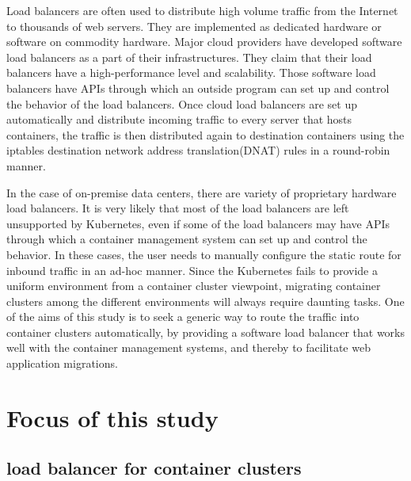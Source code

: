Load balancers are often used to distribute high volume traffic from the Internet to thousands of web servers.
They are implemented as dedicated hardware or software on commodity hardware.
Major cloud providers have developed software load balancers\cite{eisenbud2016maglev,patel2013ananta} as a part of their infrastructures.
They claim that their load balancers have a high-performance level and scalability.
Those software load balancers have APIs through which an outside program can set up and control the behavior of the load balancers.
Once cloud load balancers are set up automatically and distribute incoming traffic to every server that hosts containers,
the traffic is then distributed again to destination containers using the iptables destination network address translation(DNAT)\cite{MartinA.Brown2017,Marmol2015} rules in a round-robin manner.

In the case of on-premise data centers, there are variety of proprietary hardware load balancers.
It is very likely that most of the load balancers are left unsupported by Kubernetes, even if some of the load balancers may have APIs through which a container management system can set up and control the behavior.
In these cases, the user needs to manually configure the static route for inbound traffic in an ad-hoc manner.
Since the Kubernetes fails to provide a uniform environment from a container cluster viewpoint, migrating container clusters among the different environments will always require daunting tasks.
One of the aims of this study is to seek a generic way to route the traffic into container clusters automatically, by providing a software load balancer that works well with the container management systems, and thereby to facilitate web application migrations.


\section{Focus of this study}

\subsection{load balancer for container clusters}

